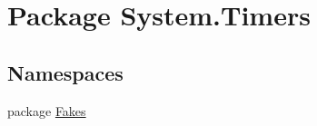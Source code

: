 \hypertarget{namespace_system_1_1_timers}{\section{Package System.\-Timers}
\label{namespace_system_1_1_timers}
}
\subsection*{Namespaces}
\begin{DoxyCompactItemize}
\item 
package \hyperlink{namespace_system_1_1_timers_1_1_fakes}{Fakes}
\end{DoxyCompactItemize}
